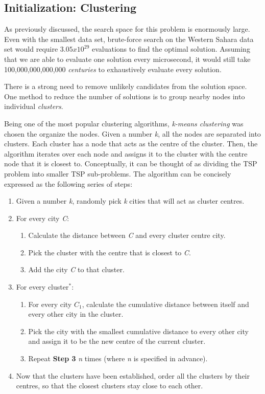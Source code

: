 \documentclass[12pt,twocolumn,oneside]{osajnl}
\begin{document}
\subsection{Initialization: Clustering}

As previously discussed, the search space for this problem is enormously large. Even with the smallest data set, brute-force search on the Western Sahara data set would require $3.05x10^{29}$ evaluations to find the optimal solution. Assuming that we are able to evaluate one solution every microsecond, it would still take 100,000,000,000,000 \textit{centuries} to exhaustively evaluate every solution.

There is a strong need to remove unlikely candidates from the solution space. One method to reduce the number of solutions is to group nearby nodes into individual \textit{clusters}. 

Being one of the most popular clustering algorithms, \textit{k-means clustering} was chosen the organize the nodes. Given a number \textit{k}, all the nodes are separated into  clusters. Each cluster has a node that acts as the centre of the cluster. Then, the algorithm iterates over each node and assigns it to the cluster with the centre node that it is closest to. Conceptually, it can be thought of as dividing the TSP problem into smaller TSP sub-problems.\cite{hartigan1979algorithm}\cite{wilkin2007k} The algorithm can be concisely expressed as the following series of steps:
\begin{enumerate}
    \item Given a number \textit{k}, randomly pick \textit{k} cities that will act as cluster centres.
    \item For every city \textit{C}:
    \begin{enumerate}
        \item Calculate the distance between \textit{C} and every cluster centre city.
        \item Pick the cluster with the centre that is closest to \textit{C}.
        \item Add the city \textit{C} to that cluster.
    \end{enumerate}  
    \item For every cluster$^{*}$:
    \begin{enumerate}
        \item For every city \textit{$C_1$}, calculate the cumulative distance between itself and every other city in the cluster.
        \item Pick the city with the smallest cumulative distance to every other city and assign it to be the new centre of the current cluster.
        \item Repeat \textbf{Step 3} \textit{n} times (where \textit{n} is specified in advance).
    \end{enumerate}
    \item Now that the clusters have been established, order all the clusters by their centres, so that the closest clusters stay close to each other.
\end{enumerate}
\end{document}
